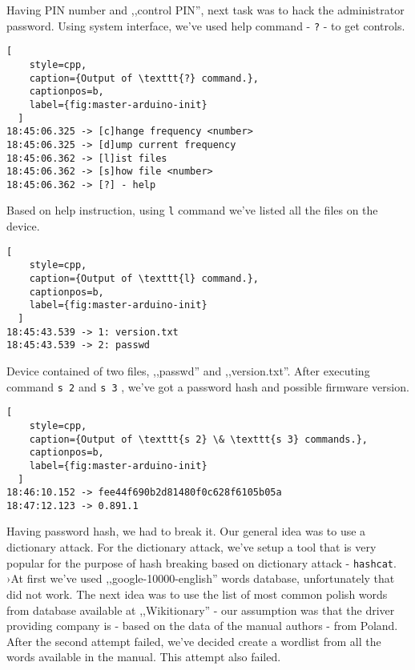 Having PIN number and ,,control PIN'', next task was to hack the administrator password. Using system interface, we've used help command - \texttt{?} - to get controls.

\begin{minipage}{\linewidth}
  \begin{lstlisting}[
    style=cpp,
    caption={Output of \texttt{?} command.},
    captionpos=b,
    label={fig:master-arduino-init}
  ]
18:45:06.325 -> [c]hange frequency <number>
18:45:06.325 -> [d]ump current frequency
18:45:06.362 -> [l]ist files
18:45:06.362 -> [s]how file <number>
18:45:06.362 -> [?] - help
  \end{lstlisting}
  \end{minipage}

Based on help instruction, using \texttt{l} command we've listed all the files on the device.

\begin{minipage}{\linewidth}
  \begin{lstlisting}[
    style=cpp,
    caption={Output of \texttt{l} command.},
    captionpos=b,
    label={fig:master-arduino-init}
  ]
18:45:43.539 -> 1: version.txt
18:45:43.539 -> 2: passwd
  \end{lstlisting}
  \end{minipage}

Device contained of two files, ,,passwd'' and ,,version.txt''. After executing command \texttt{s 2} and \texttt{s 3} , we've got a password hash and possible firmware version.


\begin{minipage}{\linewidth}
  \begin{lstlisting}[
    style=cpp,
    caption={Output of \texttt{s 2} \& \texttt{s 3} commands.},
    captionpos=b,
    label={fig:master-arduino-init}
  ]
18:46:10.152 -> fee44f690b2d81480f0c628f6105b05a
18:47:12.123 -> 0.891.1
  \end{lstlisting}
  \end{minipage}

Having password hash, we had to break it. Our general idea was to use a dictionary attack. For the dictionary attack, we've setup a tool that is very popular for the purpose of hash breaking based on dictionary attack - \texttt{hashcat}. ›At first we've used ,,google-10000-english'' words database, unfortunately that did not work. The next idea was to use the list of most common polish words from database available at ,,Wikitionary'' - our assumption was that the driver providing company is - based on the data of the manual authors - from Poland. After the second attempt failed, we've decided create a wordlist from all the words available in the manual. This attempt also failed.

